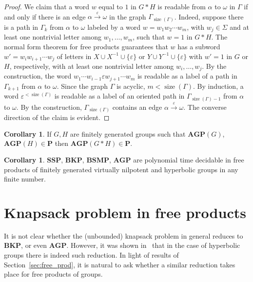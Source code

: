 \documentclass[10pt]{amsart}
\theoremstyle{definition}
\newtheorem{corollary}[theorem]{Corollary}
\DeclareMathOperator{\size}{{size}}
\def\P{{\mathbf{P}}}
\def\SSP{{\mathbf{SSP}}}
\def\BSMP{{\mathbf{BSMP}}}
\def\BKP{{\mathbf{BKP}}}
\def\AGP{{\mathbf{AGP}}}
\begin{document}
\begin{proof}
We claim that a word $w$ equal to $1$ in $G*H$ is readable from $\alpha$ to $\omega$ in $\Gamma$ if and only if there is an edge $\alpha\overset{\varepsilon}{\to}\omega$ in the graph $\Gamma_{\size(\Gamma)}$.
Indeed, suppose there is a path in $\Gamma_k$ from $\alpha$ to $\omega$ labeled by a word $w=w_1w_2\cdots w_m$, with $w_j\in \Sigma$ and at least one nontrivial letter among $w_1,\ldots, w_m$, such that $w=1$ in $G*H$.
The normal form theorem for free products guarantees that $w$ has a subword $w'=w_iw_{i+1}\cdots w_j$ of letters in $X\cup X^{-1}\cup \{\varepsilon\}$ or $Y\cup Y^{-1}\cup \{\varepsilon\}$ with $w'=1$ in $G$ or $H$, respectively, with at least one nontrivial letter among $w_i,\ldots,w_j$.
By the construction, the word $w_1\cdots w_{i-1}\varepsilon w_{j+1}\cdots w_m$ is readable as a label of a path in $\Gamma_{k+1}$ from $\alpha$ to $\omega$. Since the graph $\Gamma$ is acyclic, $m< \size(\Gamma)$.
By induction, a word $\varepsilon^{<\size(\Gamma)}$ is readable as a label of an oriented path in $\Gamma_{\size(\Gamma)-1}$ from $\alpha$ to $\omega$.
By the construction, $\Gamma_{\size(\Gamma)}$ contains an edge $\alpha\overset{\varepsilon}{\to}\omega$.
The converse direction of the claim is evident.
\end{proof}

\begin{corollary}\label{cor:ptime_agp}
If $G,H$ are finitely generated groups such that $\AGP(G)$, $\AGP(H)\in\P$ then $\AGP(G*H)\in\P$.
\end{corollary}


\begin{corollary}
$\SSP$, $\BKP$, $\BSMP$, $\AGP$ are polynomial time decidable in free products of finitely generated virtually nilpotent and hyperbolic groups in any finite number.
\end{corollary}

\section{Knapsack problem in free products}\label{sec:knapsack}
It is not clear whether the (unbounded) knapsack problem in general reduces to $\BKP$, or even $\AGP$. However, it was shown in~\cite{Miasnikov-Nikolaev-Ushakov:2014a} that in the case of hyperbolic groups there is indeed such reduction. In light of results of Section~\ref{sec:free_prod}, it is natural to ask whether a similar reduction takes place for free products of groups.
\end{document}
